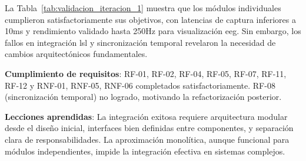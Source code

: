 La Tabla~\ref{tab:validacion_iteracion_1} muestra que los módulos individuales cumplieron satisfactoriamente sus objetivos, con latencias de captura inferiores a 10ms y rendimiento validado hasta 250Hz para visualización \acrshort{eeg}. Sin embargo, los fallos en integración \acrshort{lsl} y sincronización temporal revelaron la necesidad de cambios arquitectónicos fundamentales.

\textbf{Cumplimiento de requisitos}: RF-01, RF-02, RF-04, RF-05, RF-07, RF-11, RF-12 y RNF-01, RNF-05, RNF-06 completados satisfactoriamente. RF-08 (sincronización temporal) no logrado, motivando la refactorización posterior.

\textbf{Lecciones aprendidas}: La integración exitosa requiere arquitectura modular desde el diseño inicial, interfaces bien definidas entre componentes, y separación clara de responsabilidades. La aproximación monolítica, aunque funcional para módulos independientes, impide la integración efectiva en sistemas complejos.

